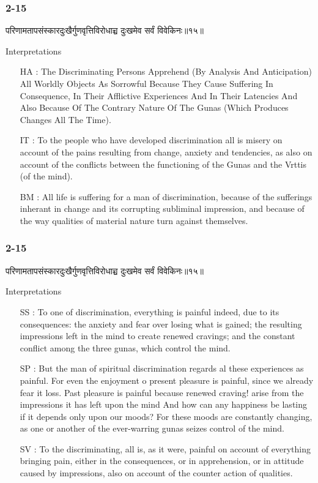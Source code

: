 \begin{frame}[fragile]\frametitle{2-15}
\begin{sanskrit}
परिणामतापसंस्कारदुःखैर्गुणवृत्तिविरोधाच्च दुःखमेव सर्वं विवेकिनः॥१५॥
\end{sanskrit}

Interpretations
\begin{itemize}
\item [HA]: The Discriminating Persons Apprehend (By Analysis And Anticipation) All Worldly Objects As Sorrowful Because They Cause Suffering In Consequence, In Their Afflictive Experiences And In Their Latencies And Also Because Of The Contrary Nature Of The Gunas (Which Produces Changes All The Time).
\item [IT]: To the people who have developed discrimination all is misery on account of the pains resulting from change, anxiety and tendencies, as also on account of the conflicts between the functioning of the Gunas and the Vrttis (of the mind).
\item [BM]: All life is suffering for a man of discrimination, because of the sufferings inherant in change and its corrupting subliminal impression, and because of the way qualities of material nature turn against themselves.
\end{itemize}
	
\end{frame}
\begin{frame}[fragile]\frametitle{2-15}
\begin{sanskrit}
परिणामतापसंस्कारदुःखैर्गुणवृत्तिविरोधाच्च दुःखमेव सर्वं विवेकिनः॥१५॥
\end{sanskrit}

Interpretations
\begin{itemize}
\item [SS]: To one of discrimination, everything is painful indeed, due to its consequences: the anxiety and fear over losing what is gained; the resulting impressions left in the mind to create renewed cravings; and the constant conflict among the three gunas, which control the mind.
\item [SP]: But the man of spiritual discrimination regards al these experiences as painful. For even the enjoyment o present pleasure is painful, since we already fear it loss. Past pleasure is painful because renewed craving! arise from the impressions it has left upon the mind And how can any happiness be lasting if it depends only upon our moods? For these moods are constantly changing, as one or another of the ever-warring gunas seizes control of the mind.
\item [SV]: To the discriminating, all is, as it were, painful on account of everything bringing pain, either in the consequences, or in apprehension, or in attitude caused by impressions, also on account of the counter action of qualities. 
\end{itemize}
	
\end{frame}

